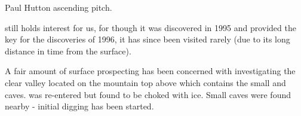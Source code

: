 \begin{marginfigure}
\checkoddpage \ifoddpage \forcerectofloat \else \forceversofloat \fi
\centering
 \caption{Paul Hutton ascending \protect{} pitch.  }
 \label{paul plopzilla}
\end{marginfigure}


 still holds interest for us, for though it was discovered in 1995
and provided the key for the discoveries of 1996, it has since been
visited rarely (due to its long distance in time from the surface).

A fair amount of surface prospecting has been concerned with investigating
the clear valley located on the mountain top above which contains the
small  and  caves.  was re-entered but found to be choked with
ice. Small caves were found nearby - initial digging has been started.
